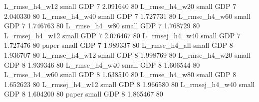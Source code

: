  L_rmse_h4_w12      small      GDP                 7 2.091640 80
 L_rmse_h4_w20      small      GDP                 7 2.040330 80
 L_rmse_h4_w40      small      GDP                 7 1.727731 80
 L_rmse_h4_w60      small      GDP                 7 1.746763 80
 L_rmse_h4_w80      small      GDP                 7 1.768729 80
L_rmsej_h4_w12      small      GDP                 7 2.076467 80
L_rmsej_h4_w40      small      GDP                 7 1.727476 80
         paper      small      GDP                 7 1.989337 80
 L_rmse_h4_all      small      GDP                 8 1.936707 80
 L_rmse_h4_w12      small      GDP                 8 1.998769 80
 L_rmse_h4_w20      small      GDP                 8 1.939346 80
 L_rmse_h4_w40      small      GDP                 8 1.606544 80
 L_rmse_h4_w60      small      GDP                 8 1.638510 80
 L_rmse_h4_w80      small      GDP                 8 1.652623 80
L_rmsej_h4_w12      small      GDP                 8 1.966580 80
L_rmsej_h4_w40      small      GDP                 8 1.604200 80
         paper      small      GDP                 8 1.865467 80